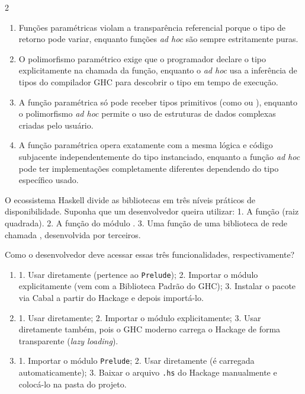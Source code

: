 \documentclass[a4paper,10pt,brazil]{article}
\begin{document}
\begin{multicols}{2}
\begin{enumerate}
  \item Funções paramétricas violam a transparência referencial porque o tipo de retorno pode variar, enquanto funções \emph{ad hoc} são sempre estritamente puras.

  \item O polimorfismo paramétrico exige que o programador declare o tipo explicitamente na chamada da função, enquanto o \emph{ad hoc} usa a inferência de tipos do compilador GHC para descobrir o tipo em tempo de execução.

  \item A função paramétrica só pode receber tipos primitivos (como  ou ), enquanto o polimorfismo \emph{ad hoc} permite o uso de estruturas de dados complexas criadas pelo usuário.

  \item A função paramétrica opera exatamente com a mesma lógica e código subjacente independentemente do tipo instanciado, enquanto a função \emph{ad hoc} pode ter implementações completamente diferentes dependendo do tipo específico usado.


\end{enumerate}

O ecossistema Haskell divide as bibliotecas em três níveis práticos de disponibilidade. Suponha que um desenvolvedor queira utilizar:
1. A função  (raiz quadrada).
2. A função  do módulo .
3. Uma função de uma biblioteca de rede chamada , desenvolvida por terceiros.

Como o desenvolvedor deve acessar essas três funcionalidades, respectivamente?

\begin{enumerate}
  \item 1. Usar diretamente (pertence ao \texttt{Prelude}); 2. Importar o módulo explicitamente (vem com a Biblioteca Padrão do GHC); 3. Instalar o pacote via Cabal a partir do Hackage e depois importá-lo.

  \item 1. Usar diretamente; 2. Importar o módulo explicitamente; 3. Usar diretamente também, pois o GHC moderno carrega o Hackage de forma transparente (\emph{lazy loading}).

  \item 1. Importar o módulo \texttt{Prelude}; 2. Usar diretamente (é carregada automaticamente); 3. Baixar o arquivo \texttt{.hs} do Hackage manualmente e colocá-lo na pasta do projeto.


\end{enumerate}
\end{multicols}
\end{document}
